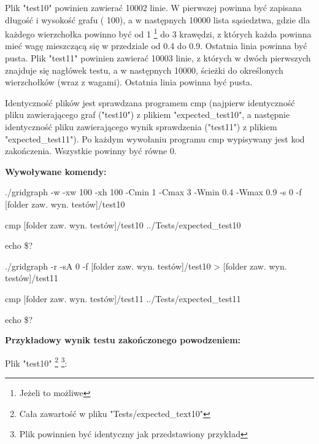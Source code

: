 \documentclass[11pt,a4paper]{report}
\def\console #1{\begingroup\fontfamily{qcr}\selectfont#1\endgroup}
\newenvironment{multiconsole}{\begingroup\fontfamily{qcr}\selectfont}{\endgroup}
\begin{document}
    Plik "test10" powinien zawierać 10002 linie. W pierwszej powinna być zapisana długość i wysokość grafu (\console{100 100}), a w następnych 10000 lista sąsiedztwa, gdzie dla każdego wierzchołka powinno być od 1 \footnote{Jeżeli to możliwe} do 3 krawędzi, z których każda powinna mieć wagę mieszczącą się w przedziale od 0.4 do 0.9. Ostatnia linia powinna być pusta. Plik "test11" powinien zawierać 10003 linie, z których w dwóch pierwszych znajduje się nagłówek testu, a w następnych 10000, ścieżki do określonych wierzchołków (wraz z wagami). Ostatnia linia powinna być pusta.

    Identyczność plików jest sprawdzana programem \console{cmp} (najpierw identyczność pliku zawierającego graf ("test10") z plikiem "expected\_test10", a następnie identyczność pliku zawierającego wynik sprawdzenia ("test11") z plikiem "expected\_test11"). Po każdym wywołaniu programu \console{cmp} wypisywany jest kod zakończenia. Wszystkie powinny być równe 0.

    \vspace{2em}

    \textbf{Wywoływane komendy:}

    \vspace{1em}

    \begin{multiconsole}
        ./gridgraph -w -xw 100 -xh 100 -Cmin 1 -Cmax 3 -Wmin 0.4 -Wmax 0.9 -s 0 -f [folder zaw. wyn. testów]/test10

        cmp [folder zaw. wyn. testów]/test10 ../Tests/expected\_test10

        echo \$?

        ./gridgraph -r -sA 0 -f [folder zaw. wyn. testów]/test10 > [folder zaw. wyn. testów]/test11

        cmp [folder zaw. wyn. testów]/test11 ../Tests/expected\_test11

        echo \$?
    \end{multiconsole}

    \vspace{2em}

    \textbf{Przykładowy wynik testu zakończonego powodzeniem:}

    \vspace{1em}

    Plik "test10" \footnote{Cała zawartość w pliku "Tests/expected\_text10"} \footnote{Plik powinnien być identyczny jak przedstawiony przykład}:
\end{document}
